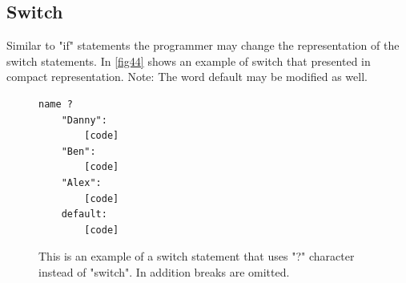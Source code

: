\subsection{Switch}
Similar to "if" statements the programmer may change the representation of the switch statements. In \autoref{fig44} shows an example of switch that presented in compact representation. Note: The word default may be modified as well.
\begin{figure}[H]
\begin{lstlisting}
name ?
	"Danny": 
		[code]
	"Ben": 
		[code]
	"Alex": 
		[code]
	default: 
		[code]
\end{lstlisting}
\caption{This is an example of a switch statement that uses "?" character instead of "switch". In addition breaks are omitted.}
\label{fig44}
\end{figure}
